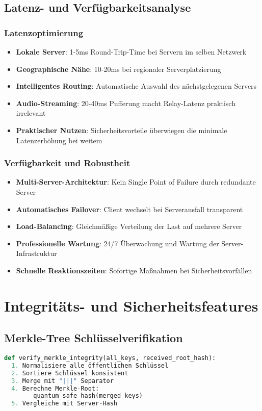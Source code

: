 \documentclass[10pt,a4paper]{article}
\begin{document}
\subsection{Latenz- und Verfügbarkeitsanalyse}

\subsubsection{Latenzoptimierung}
\begin{itemize}[left=0pt]
\item \textbf{Lokale Server}: 1-5ms Round-Trip-Time bei Servern im selben Netzwerk
\item \textbf{Geographische Nähe}: 10-20ms bei regionaler Serverplatzierung
\item \textbf{Intelligentes Routing}: Automatische Auswahl des nächstgelegenen Servers
\item \textbf{Audio-Streaming}: 20-40ms Pufferung macht Relay-Latenz praktisch irrelevant
\item \textbf{Praktischer Nutzen}: Sicherheitsvorteile überwiegen die minimale Latenzerhöhung bei weitem
\end{itemize}

\subsubsection{Verfügbarkeit und Robustheit}
\begin{itemize}[left=0pt]
\item \textbf{Multi-Server-Architektur}: Kein Single Point of Failure durch redundante Server
\item \textbf{Automatisches Failover}: Client wechselt bei Serverausfall transparent
\item \textbf{Load-Balancing}: Gleichmäßige Verteilung der Last auf mehrere Server
\item \textbf{Professionelle Wartung}: 24/7 Überwachung und Wartung der Server-Infrastruktur
\item \textbf{Schnelle Reaktionszeiten}: Sofortige Maßnahmen bei Sicherheitsvorfällen
\end{itemize}

\section{Integritäts- und Sicherheitsfeatures}

\subsection{Merkle-Tree Schlüsselverifikation}
\begin{lstlisting}[language=Python]
def verify_merkle_integrity(all_keys, received_root_hash):
  1. Normalisiere alle öffentlichen Schlüssel
  2. Sortiere Schlüssel konsistent
  3. Merge mit "|||" Separator
  4. Berechne Merkle-Root:
        quantum_safe_hash(merged_keys)
  5. Vergleiche mit Server-Hash
\end{lstlisting}
\end{document}

